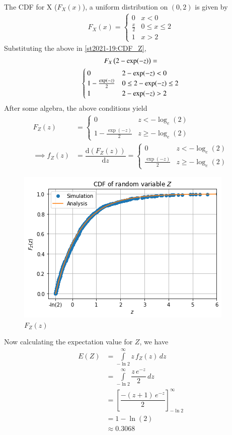 The CDF for X ($F_X(x)$), a uniform distribution on $(0,2)$ is given by
\begin{align}
F_X(x) = 
\begin{cases}
0 &  x < 0 \\
\frac{x}{2} & 0 \leq x \leq 2 \\
1 & x > 2
\end{cases}
\end{align}
%
Substituting the above in \eqref{st2021-19:CDF_Z},
%
\begin{multline}
F_X\left(2- \exp(-z)\right) =
\\
\begin{cases}
0 &  2- \exp(-z) < 0 \\
1- \frac{\exp(-z)}{2} & 0 \leq 2- \exp(-z) \leq 2 \\
1 & 2- \exp(-z) > 2
\end{cases}
\end{multline}
After some algebra, the above conditions yield
\begin{align}
F_Z(z) &= 
\begin{cases}
0 & z < -\log_e (2) \\
1- \frac{\exp(-z)}{2} & z \geq -\log_e (2)
\end{cases}
\label{st2021-19:CDF_Z_Final}\\
\implies f_Z(z)&=\dfrac{\text{d}(F_Z(z))}{\text{d}z}   
=\begin{cases}
0 & z < -\log_e (2) \\
\frac{\exp(-z)}{2} & z \geq -\log_e (2)
\end{cases}
\label{st2021-19:PDF_Z_Final}
\end{align}
\begin{figure}[!ht]
    \centering
      \includegraphics[width=\columnwidth]{solutions/adv/st/2021/19/Figures/CDF_Z.png}
     \caption{$F_Z(z)$}
\end{figure}
Now calculating the expectation value for $Z$, we have
\begin{align}
    E(Z)&=\int\limits_{-\ln{2}}^{\infty}z\,f_Z(z)\,dz\\
    &=\int\limits_{-\ln{2}}^{\infty}\dfrac{z\,e^{-z}}{2}\,dz\\
    &=\left[ \dfrac{-(z+1)\,e^{-z}}{2} \right]_{-\ln{2}}^\infty\\
    &=1-\ln{(2)}\\
    &\approx0.3068
\end{align}
